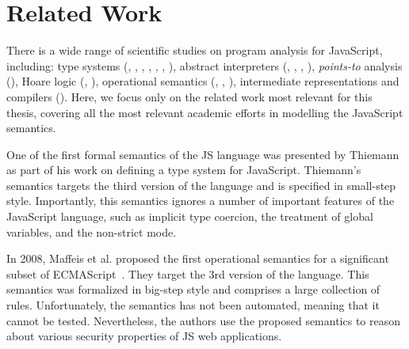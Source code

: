 \documentclass[runningheads]{llncs}
\begin{document}
\section{Related Work}
\label{sec:Related Work}

There is a wide range of scientific studies on program analysis for JavaScript, including: type systems (\cite{Type_Analysis_for_JavaScript}, \cite{Towards_Type_Inference_for_JavaScript}, \cite{Understanding_TypeScript},  \cite{Fast_and_precise_hybrid_type_inference_for_JavaScript}, \cite{Depedent_Types_for_JavaScript}, \cite{Safe_&_Efficient_Gradual_Typing_for_TypeScript},  \cite{Type_Inference_for_Static_Compilation_of_JavaScript}), abstract interpreters (\cite{SAFE:Formal_Specification_and_Implementation_of_a_Scalable_Analysis_Framework_for_ECMAScript}, \cite{JSAI:a_static_analysis_platform_for_JavaScript}, \cite{Scalable_and_Precise_Static_Analysis_of_JavaScript_Applications_via_Loop-Sensitivity},  \cite{Combining_string_abstract_domains_for_JavaScript_analysis:an_evaluation)}), \emph{points-to} analysis (\cite{Points-to_analysis_for_JavaScript}), Hoare logic (\cite{Javert-2017}, \cite{Javert-2019}), operational semantics (\cite{JSCert-2014}, \cite{KJS-2015}, \cite{JSExplain-2018}), intermediate representations and compilers (\cite{Dynamic_property_caches:a_step_towards_faster_JavaScript_proxy_objects}). Here, we focus only on the related work most relevant for this thesis, covering all the most relevant academic efforts in modelling the JavaScript semantics.

One of the first formal semantics of the JS language was presented by Thiemann~\cite{Thiemann-2005} as part of his work on defining a type system for JavaScript. Thiemann's semantics targets the third version of the language and is specified in small-step style. Importantly, this semantics ignores a number of important features of the JavaScript language, such as implicit type coercion, the treatment of global variables, and the non-strict mode. 

In 2008, Maffeis et al. proposed the first operational semantics for a significant subset of ECMAScript~\cite{operational_semantics_javascript-2008}. They target the 3rd version of the language. This semantics was formalized in big-step style and comprises a large collection of rules. Unfortunately, the semantics has not been automated, meaning that it cannot be tested. Nevertheless, the authors use the proposed semantics to reason about various security properties of JS web applications. 
\end{document}
